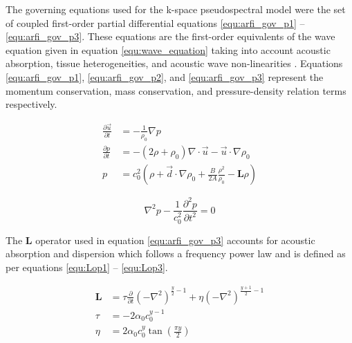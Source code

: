 			The governing equations used for the k-space pseudospectral model were the set of coupled first-order partial differential equations \ref{equ:arfi_gov_p1} -- \ref{equ:arfi_gov_p3}. These equations are the first-order equivalents of the wave equation given in equation \ref{equ:wave_equation} taking into account acoustic absorption, tissue heterogeneities, and acoustic wave non-linearities \cite{treeby12}. Equations \ref{equ:arfi_gov_p1}, \ref{equ:arfi_gov_p2}, and \ref{equ:arfi_gov_p3} represent the momentum conservation, mass conservation, and pressure-density relation terms respectively.

			\begin{subequations}
				\label{equ:arfi_gov}
				\begin{align}
					\frac{\partial \vec{u}}{\partial t} &= - \frac{1}{\rho_0} \nabla p \label{equ:arfi_gov_p1} \\
					\frac{\partial p}{\partial t} &= -\left(2 \rho + \rho_0\right)\nabla \cdot \vec{u} - \vec{u} \cdot \nabla \rho_0 \label{equ:arfi_gov_p2} \\
					p &= c_0^2 \left(\rho + \vec{d} \cdot \nabla \rho_0 + \frac{B}{2A} \frac{\rho^2}{\rho_0} - \mathbf{L}\rho \right) \label{equ:arfi_gov_p3}
				\end{align}
			\end{subequations}


			\begin{equation}
				\label{equ:wave_equation}
				\nabla^2 p - \frac{1}{c_0^2}\frac{\partial^2 p}{\partial t^2} = 0
			\end{equation}

			The $\mathbf{L}$ operator used in equation \ref{equ:arfi_gov_p3} accounts for acoustic absorption and dispersion which follows a frequency power law and is defined as per equations \ref{equ:Lop1} -- \ref{equ:Lop3}.

			\begin{subequations}
				\begin{align}
					\mathbf{L} &= \tau \frac{\partial}{\partial t}\left(-\nabla^2\right)^{\frac{y}{2} - 1} + \eta \left(-\nabla^2\right)^{\frac{y+1}{2} - 1} \label{equ:Lop1} \\
					\tau &= -2\alpha_0 c_0^{y-1} \label{equ:Lop2} \\
					\eta &= 2\alpha_0c_0^y\tan\left(\frac{\pi y}{2}\right)  \label{equ:Lop3}
				\end{align}
			\end{subequations}

